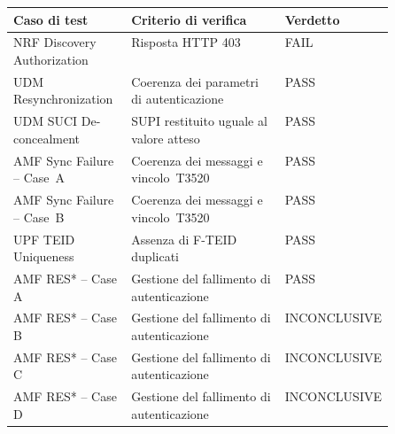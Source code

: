 \begin{center}
\begin{minipage}{\textwidth}
\centering

\begingroup
\small
\setlength{\tabcolsep}{5pt}
\renewcommand{\arraystretch}{1.3}

\begin{tabularx}{\linewidth}{|
    >{\raggedright\arraybackslash}p{0.31\linewidth}|
    >{\raggedright\arraybackslash}X|
    >{\centering\arraybackslash}p{0.19\linewidth}|}
\hline

\rowcolor{blue!7}
\textbf{Caso di test} &
\textbf{Criterio di verifica} &
\textbf{Verdetto} \\
\hline

NRF Discovery Authorization &
Risposta HTTP 403 &
FAIL \\
\hline

UDM Resynchronization &
Coerenza dei parametri di autenticazione &
PASS \\
\hline

UDM SUCI De-concealment &
SUPI restituito uguale al valore atteso &
PASS \\
\hline

AMF Sync Failure -- \mbox{Case A} &
Coerenza dei messaggi e \mbox{vincolo T3520} &
PASS \\
\hline

AMF Sync Failure -- \mbox{Case B} &
Coerenza dei messaggi e \mbox{vincolo T3520} &
PASS \\
\hline

UPF TEID Uniqueness &
Assenza di F-TEID duplicati &
PASS \\
\hline

AMF RES* -- Case A &
Gestione del fallimento di autenticazione &
PASS \\
\hline

AMF RES* -- Case B &
Gestione del fallimento di autenticazione &
\mbox{INCONCLUSIVE} \\
\hline

AMF RES* -- Case C &
Gestione del fallimento di autenticazione &
\mbox{INCONCLUSIVE} \\
\hline

AMF RES* -- Case D &
Gestione del fallimento di autenticazione &
\mbox{INCONCLUSIVE} \\
\hline

\end{tabularx}
\endgroup

\label{tab:open5gs_results}

\end{minipage}
\end{center}




